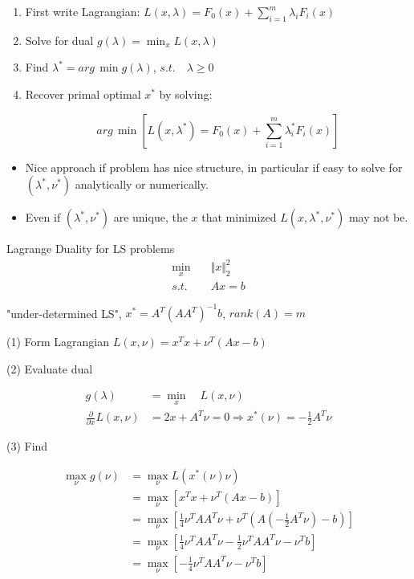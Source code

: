 \begin{enumerate}
	\item First write Lagrangian: $L(x, \lambda) = F_0(x) + \sum^m_{i=1}\lambda_iF_i(x)$
	
	\item Solve for dual $g(\lambda) = \min_{x} L(x, \lambda)$
	
	\item Find $\lambda^* = arg\, \min g(\lambda)$, $s.t. \quad \lambda \geq 0$
	
	\item Recover primal optimal $x^*$ by solving:
	
	\begin{equation*}
	arg\, \min[L(x, \lambda^*) = F_0(x) + \sum^m_{i=1}\lambda_i^*F_i(x)]
	\end{equation*}
\end{enumerate}

\begin{itemize}
	\item Nice approach if problem has nice structure, in particular if easy to solve for $(\lambda^*, \nu^*)$ analytically or numerically. 
	
	\item Even if $(\lambda^*, \nu^*)$ are unique, the $x$ that minimized $L(x, \lambda^*, \nu^*)$ may not be.
\end{itemize}



\begin{example}
	Lagrange Duality for LS problems
	\begin{align*}
	\min_x \quad &\Vert x \Vert_2^2\\
	s.t.\quad &Ax = b
	\end{align*}
	
	"under-determined LS", $x^* = A^T(AA^T)^{-1}b$, $rank(A) = m$
	
	(1) Form Lagrangian $L(x, \nu) = x^Tx + \nu^T(Ax - b)$
	
	
	(2) Evaluate dual
	
	\begin{align*}
	g(\lambda) &= \min_x \quad L(x, \nu)\\
	\frac{\partial}{\partial x} L(x, \nu) &= 2x+A^T\nu = 0\Rightarrow x^*(\nu) = -\frac{1}{2}A^T\nu
	\end{align*}
	
	
	(3) Find
	
	
	\begin{align*}
	\max_{\nu} g(\nu) &= \max_{\nu} L(x^*(\nu)\nu)\\
	&= \max_{\nu}[x^Tx + \nu^T(Ax - b)]\\
	&= \max_{\nu}[\frac{1}{4}\nu^TAA^T\nu + \nu^T(A(-\frac{1}{2}A^T\nu)-b)]\\
	&= \max_{\nu}[\frac{1}{4}\nu^TAA^T\nu - \frac{1}{2}\nu^TAA^T\nu - \nu^Tb]\\
	&= \max_{\nu}[-\frac{1}{4}\nu^TAA^T\nu - \nu^Tb]
	\end{align*}
\end{example}

